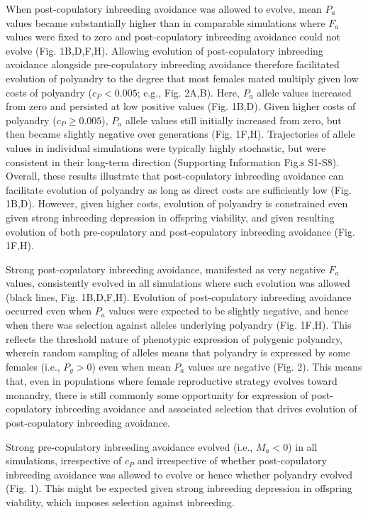 \documentclass[12pt]{article}
\begin{document}
When post-copulatory inbreeding avoidance was allowed to evolve, mean $P_{a}$ values became substantially higher than in comparable simulations where $F_{a}$ values were fixed to zero and post-copulatory inbreeding avoidance could not evolve (Fig. 1B,D,F,H). Allowing evolution of post-copulatory inbreeding avoidance alongside pre-copulatory inbreeding avoidance therefore facilitated evolution of polyandry to the degree that most females mated multiply given low costs of polyandry ($c_{P} < 0.005$; e.g., Fig. 2A,B). Here, $P_{a}$ allele values increased from zero and persisted at low positive values (Fig. 1B,D). Given higher costs of polyandry ($c_{P} \geq 0.005$), $P_{a}$ allele values still initially increased from zero, but then became slightly negative over generations (Fig. 1F,H). Trajectories of allele values in individual simulations were typically highly stochastic, but were consistent in their long-term direction (Supporting Information Fig.s S1-S8). Overall, these results illustrate that post-copulatory inbreeding avoidance can facilitate evolution of polyandry as long as direct costs are sufficiently low (Fig. 1B,D). However, given higher costs, evolution of polyandry is constrained even given strong inbreeding depression in offspring viability, and given resulting evolution of both pre-copulatory and post-copulatory inbreeding avoidance (Fig. 1F,H).

Strong post-copulatory inbreeding avoidance, manifested as very negative $F_{a}$ values, consistently evolved in all simulations where such evolution was allowed (black lines, Fig. 1B,D,F,H). Evolution of post-copulatory inbreeding avoidance occurred even when $P_{a}$ values were expected to be slightly negative, and hence when there was selection against alleles underlying polyandry (Fig. 1F,H). This reflects the threshold nature of phenotypic expression of polygenic polyandry, wherein random sampling of alleles means that polyandry is expressed by some females (i.e., $P_{g}>0$) even when mean $P_{a}$ values are negative (Fig. 2). This means that, even in populations where female reproductive strategy evolves toward monandry, there is still commonly some opportunity for expression of post-copulatory inbreeding avoidance and associated selection that drives evolution of post-copulatory inbreeding avoidance.

Strong pre-copulatory inbreeding avoidance evolved (i.e., $M_{a}<0$) in all simulations, irrespective of $c_{P}$ and irrespective of whether post-copulatory inbreeding avoidance was allowed to evolve or hence whether polyandry evolved (Fig. 1). This might be expected given strong inbreeding depression in offspring viability, which imposes selection against inbreeding.
\end{document}
